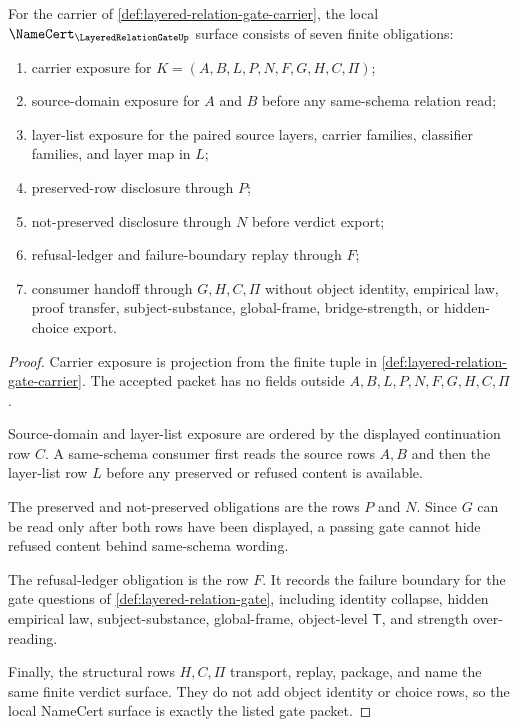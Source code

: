 \begin{theorem}
\label{thm:layered-relation-gate-namecert-obligations}
For the carrier of \autoref{def:layered-relation-gate-carrier}, the local $\NameCert_{\LayeredRelationGateUp}$ surface consists of seven finite obligations:
\begin{enumerate}
\item carrier exposure for $K=(A,B,L,P,N,F,G,H,C,\Pi)$;
\item source-domain exposure for $A$ and $B$ before any same-schema relation read;
\item layer-list exposure for the paired source layers, carrier families, classifier families, and layer map in $L$;
\item preserved-row disclosure through $P$;
\item not-preserved disclosure through $N$ before verdict export;
\item refusal-ledger and failure-boundary replay through $F$;
\item consumer handoff through $G,H,C,\Pi$ without object identity, empirical law, proof transfer, subject-substance, global-frame, bridge-strength, or hidden-choice export.
\end{enumerate}
\end{theorem}
\begin{proof}
Carrier exposure is projection from the finite tuple in \autoref{def:layered-relation-gate-carrier}. The accepted packet has no fields outside $A,B,L,P,N,F,G,H,C,\Pi$.

Source-domain and layer-list exposure are ordered by the displayed continuation row $C$. A same-schema consumer first reads the source rows $A,B$ and then the layer-list row $L$ before any preserved or refused content is available.

The preserved and not-preserved obligations are the rows $P$ and $N$. Since $G$ can be read only after both rows have been displayed, a passing gate cannot hide refused content behind same-schema wording.

The refusal-ledger obligation is the row $F$. It records the failure boundary for the gate questions of \autoref{def:layered-relation-gate}, including identity collapse, hidden empirical law, subject-substance, global-frame, object-level $\mathsf{T}$, and strength over-reading.

Finally, the structural rows $H,C,\Pi$ transport, replay, package, and name the same finite verdict surface. They do not add object identity or choice rows, so the local NameCert surface is exactly the listed gate packet.
\end{proof}

